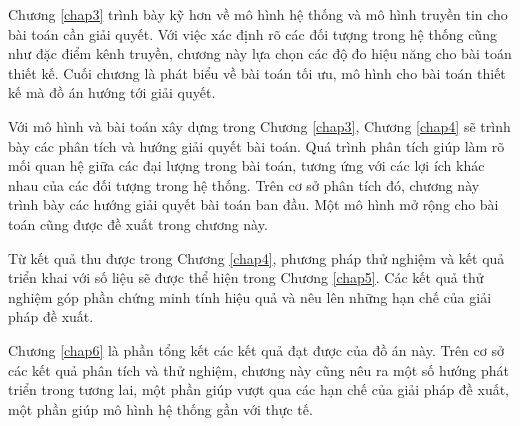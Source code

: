 \documentclass[../main.tex]{subfiles}
\begin{document}
Chương \ref{chap3} trình bày kỹ hơn về mô hình hệ thống và mô hình truyền tin cho bài toán cần giải quyết. Với việc xác định rõ các đối tượng trong hệ thống cũng như đặc điểm kênh truyền, chương này lựa chọn các độ đo hiệu năng cho bài toán thiết kế. Cuối chương là phát biểu về bài toán tối ưu, mô hình cho bài toán thiết kế mà đồ án hướng tới giải quyết.

Với mô hình và bài toán xây dựng trong Chương \ref{chap3}, Chương \ref{chap4} sẽ trình bày các phân tích và hướng giải quyết bài toán. Quá trình phân tích giúp làm rõ mối quan hệ giữa các đại lượng trong bài toán, tương ứng với các lợi ích khác nhau của các đối tượng trong hệ thống. Trên cơ sở phân tích đó, chương này trình bày các hướng giải quyết bài toán ban đầu. Một mô hình mở rộng cho bài toán cũng được đề xuất trong chương này.

Từ kết quả thu được trong Chương \ref{chap4}, phương pháp thử nghiệm và kết quả triển khai với số liệu sẽ được thể hiện trong Chương \ref{chap5}. Các kết quả thử nghiệm góp phần chứng minh tính hiệu quả và nêu lên những hạn chế của giải pháp đề xuất.

Chương \ref{chap6} là phần tổng kết các kết quả đạt được của đồ án này. Trên cơ sở các kết quả phân tích và thử nghiệm, chương này cũng nêu ra một số hướng phát triển trong tương lai, một phần giúp vượt qua các hạn chế của giải pháp đề xuất, một phần giúp mô hình hệ thống gần với thực tế.
\end{document}
